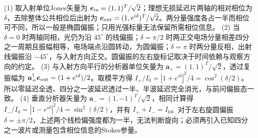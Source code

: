 (1) 取入射单位Jones矢量为 \(\boldsymbol e_{\rm in}=(1,1)^T/\sqrt2\)；理想无损延迟片两轴的相对相位为 \(\delta\)，去除整体公共相位后出射为 \(\boldsymbol e_{\rm out}=(1,e^{i\delta})^T/\sqrt2\)。两分量强度各占一半而相位可不同，所以一般是椭圆偏振；只用光强标量无法保留所需相位信息。
(2) 当 \(\delta=0\) 时两轴同相，光仍为沿 \(45^\circ\) 的线偏振；\(\delta=\pi/2\) 时两正交电场分量相差四分之一周期且振幅相等，电场端点沿圆转动，为圆偏振；\(\delta=\pi\) 时两分量反相，出射线偏振沿 \(-45^\circ\)，与入射方向正交。圆偏振的左右旋标记取决于时间依赖与观察方向的约定。
(3) 与入射方向平行的分析器单位矢量为 \(\boldsymbol a_+=(1,1)^T/\sqrt2\)，透过复振幅为 \(\boldsymbol a_+^\dagger\boldsymbol e_{\rm out}=(1+e^{i\delta})/2\)。取模平方得 \(I_+/I_0=|1+e^{i\delta}|^2/4=\cos^2(\delta/2)\)。所以零延迟全透、四分之一波延迟透过一半、半波延迟完全消光，与前问偏振态一致。
(4) 垂直分析器矢量为 \(\boldsymbol a_-=(1,-1)^T/\sqrt2\)，相同计算得 \(I_-/I_0=|1-e^{i\delta}|^2/4=\sin^2(\delta/2)\)，并有 \(I_++I_-=I_0\)。对于左右旋圆偏振 \(\delta=\pm\pi/2\)，上述两个线检偏强度都为一半，无法判断旋向；必须再引入已知四分之一波片或测量包含相位信息的Stokes参量。
